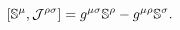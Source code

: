 \begin{equation}
\left[ \Bbb{S}^{\mu },\mathcal{J}^{\rho \sigma }\right] =g^{\mu \sigma }\Bbb{%
S}^{\rho }-g^{\mu \rho }\Bbb{S}^{\sigma }.
\end{equation}

